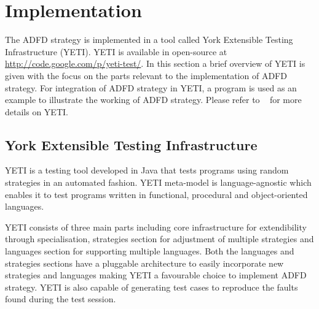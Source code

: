 


\section{Implementation}\label{sec:implementation}
The ADFD strategy is implemented in a tool called York Extensible Testing Infrastructure (YETI). YETI is available in open-source at \url{http://code.google.com/p/yeti-test/}. In this section a brief overview of YETI is given with the focus on the parts relevant to the implementation of ADFD strategy. For integration of ADFD strategy in YETI, a program is used as an example to illustrate the working of ADFD strategy. Please refer to ~\cite{Oriol2011, Oriol2012, Oriol2010, Oriol2010b} for more details on YETI.

\subsection{York Extensible Testing Infrastructure}
YETI is a testing tool developed in Java that tests programs using random strategies in an automated fashion. YETI meta-model is language-agnostic which enables it to test programs written in functional, procedural and object-oriented languages.

YETI consists of three main parts including core infrastructure for extendibility through specialisation, strategies section for adjustment of multiple strategies and languages section for supporting multiple languages. Both the languages and strategies sections have a pluggable architecture to easily incorporate new strategies and languages making YETI a favourable choice to implement ADFD strategy. YETI is also capable of generating test cases to reproduce the faults found during the test session.
 
